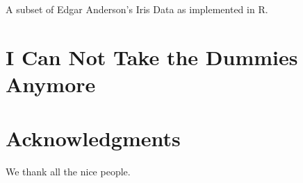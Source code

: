 \begin{multicols}{2}
\begin{supplTable*}[!t]
\centering
\captionsetup{width=.9\linewidth}
\caption[Subset of Anderson's Iris Data]{\label{tab:c2st1}
A subset of Edgar Anderson's Iris Data as implemented in R.}
\begin{small}

\end{small}
\end{supplTable*}

\section{I Can Not Take the Dummies Anymore}
\textcolor{black!35}{\lipsum[10-11]}

\section*{Acknowledgments}

We thank all the nice people.

\end{multicols}
